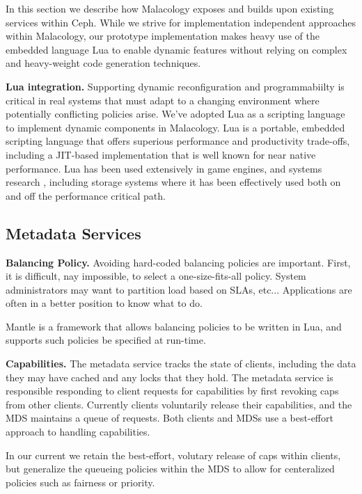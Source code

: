\documentclass[10pt,twocolumn]{article}
\begin{document}
In this section we describe how Malacology exposes and builds upon existing
services within Ceph. While we strive for implementation independent
approaches within Malacology, our prototype implementation makes heavy use of
the embedded language Lua to enable dynamic features without relying on
complex and heavy-weight code generation techniques.

{\bf Lua integration.}
Supporting dynamic reconfiguration and programmabiilty is critical in real
systems that must adapt to a changing environment where potentially
conflicting policies arise. We've adopted Lua as a scripting language to
implement dynamic components in Malacology.  Lua is a portable, embedded
scripting language that offers superious performance and productivity
trade-offs, including a JIT-based implementation that is well known for near
native performance. Lua has been used extensively in game engines, and systems
research \cite{neto:dls14-luaos}, including storage systems where it has been
effectively used both on
\cite{grawinkel:pdsw2012-lua,watkins2013:bdmc13-in-vivo} and off
\cite{sevilla:sc15-mantle} the performance critical path.

\subsection{Metadata Services}

%

{\bf Balancing Policy.}
Avoiding hard-coded balancing policies are important. First, it is difficult,
nay impossible, to select a one-size-fits-all policy. System administrators
may want to partition load based on SLAs, etc... Applications are often in
a better position to know what to do.

Mantle is a framework that allows balancing policies to be written in Lua,
and supports such policies be specified at run-time.

{\bf Capabilities.}
The metadata service tracks the state of clients, including the data they
may have cached and any locks that they hold. The metadata service is
responsible responding to client requests for capabilities by first
revoking caps from other clients. Currently clients voluntarily
release their capabilities, and the MDS maintains a queue of requests.
Both clients and MDSs use a best-effort approach to handling capabilities.

In our current we retain the best-effort, volutary release of caps within
clients, but generalize the queueing policies within the MDS to allow for
centeralized policies such as fairness or priority.
\end{document}
